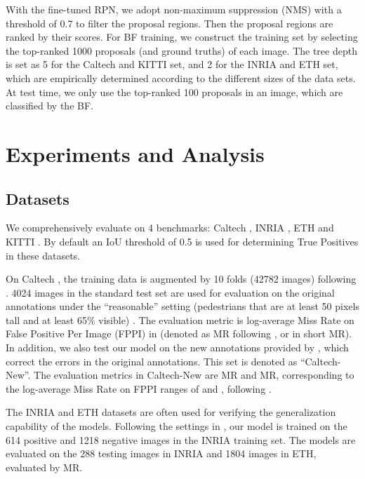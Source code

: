 \documentclass[runningheads]{llncs}
\begin{document}
With the fine-tuned RPN, we adopt non-maximum suppression (NMS) with a threshold of 0.7 to filter the proposal regions. Then the proposal regions are ranked by their scores. 
For BF training, we construct the training set by selecting the top-ranked 1000 proposals (and ground truths) of each image. The tree depth is set as 5 for the Caltech and KITTI set, and 2 for the INRIA and ETH set, which are empirically determined according to the different sizes of the data sets. At test time, we only use the top-ranked 100 proposals in an image, which are classified by the BF.

\section{Experiments and Analysis}

\subsection{Datasets}

We comprehensively evaluate on 4 benchmarks: Caltech \cite{dollar2012pedestrian}, INRIA \cite{dalal2005histograms}, ETH \cite{ess2007depth} and KITTI \cite{geiger2012kitti}. By default an IoU threshold of 0.5 is used for determining True Positives in these datasets.

On Caltech \cite{dollar2012pedestrian}, the training data is augmented by 10 folds (42782 images) following \cite{hosang2015taking}. 4024 images in the standard test set are used for evaluation on the original annotations under the ``reasonable''  setting (pedestrians that are at least 50 pixels tall and at least 65\% visible) \cite{dollar2012pedestrian}. The evaluation metric is log-average Miss Rate on False Positive Per Image (FPPI) in  (denoted as MR following \cite{Zhang2016}, or in short MR). In addition, we also test our model on the new annotations provided by \cite{Zhang2016}, which correct the errors in the original annotations. This set is denoted as ``Caltech-New''. The evaluation metrics in Caltech-New are MR and MR, corresponding to the log-average Miss Rate on FPPI ranges of  and , following \cite{Zhang2016}.

The INRIA \cite{dalal2005histograms} and ETH \cite{ess2007depth} datasets are often used for verifying the generalization capability of the models. Following the settings in  \cite{paisitkriangkrai2014strengthening}, our model is trained on the 614 positive and 1218 negative images in the INRIA training set. The models are evaluated on the 288 testing images in INRIA and 1804 images in ETH, evaluated by MR.
\end{document}
